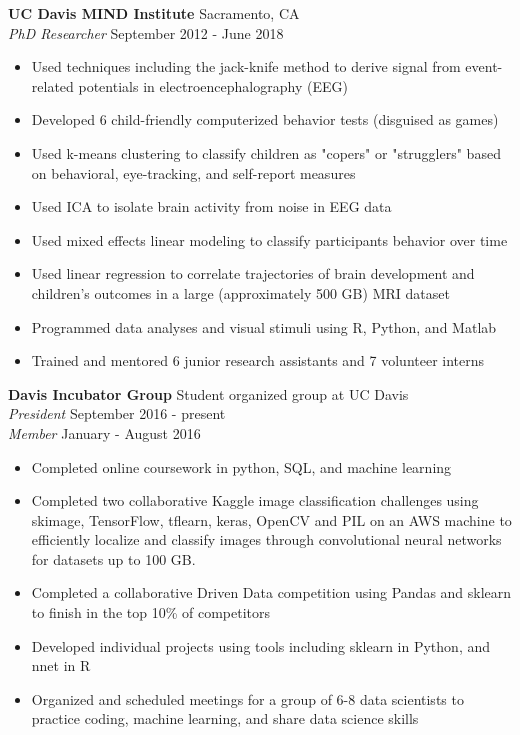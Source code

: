 \documentclass[line,margin,10pt]{res}
\begin{document}
\begin{resume}
\textbf{UC Davis MIND Institute} \hfill Sacramento, CA \\
{\sl PhD Researcher} \hfill September 2012 - June 2018
\begin{itemize} \itemsep -2pt
\item Used techniques including the jack-knife method to derive signal from event-related potentials in electroencephalography (EEG)
\item Developed 6 child-friendly computerized behavior tests (disguised as games)
\item Used k-means clustering to classify children as "copers" or "strugglers" based on behavioral, eye-tracking, and self-report measures
\item Used ICA to isolate brain activity from noise in EEG data
\item Used mixed effects linear modeling to classify participants behavior over time
\item Used linear regression to correlate trajectories of brain development and children's outcomes in a large (approximately 500 GB) MRI dataset
\item Programmed data analyses and visual stimuli using R, Python, and Matlab
\item Trained and mentored 6 junior research assistants and 7 volunteer interns
\end{itemize}

\textbf{Davis Incubator Group} \hfill Student organized group at UC Davis\\
{\sl President} \hfill September 2016 - present\\
{\sl Member} \hfill January - August 2016 
\begin{itemize} \itemsep -2pt
\item Completed online coursework in python, SQL, and machine learning
\item Completed two collaborative Kaggle image classification challenges using skimage, TensorFlow, tflearn, keras, OpenCV and PIL on an AWS machine to efficiently localize and classify images through convolutional neural networks for datasets up to 100 GB.
\item Completed a collaborative Driven Data competition using Pandas and sklearn to finish in the top 10\% of competitors
\item Developed individual projects using tools including sklearn in Python, and nnet in R
\item Organized and scheduled meetings for a group of 6-8 data scientists to practice coding, machine learning, and share data science skills
\end{itemize}


\end{resume}
\end{document}
